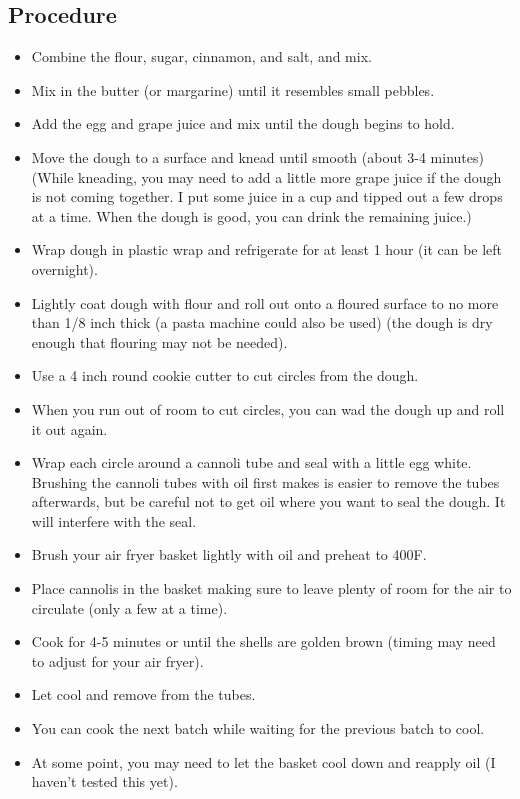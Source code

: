 \documentclass[10pt, openany]{book}
\begin{document}
\subsection{Procedure}
\begin{itemize}
  \item Combine the flour, sugar, cinnamon, and salt, and mix.
  \item Mix in the butter (or margarine) until it resembles small pebbles.
  \item Add the egg and grape juice and mix until the dough begins to hold.
  \item Move the dough to a surface and knead until smooth (about 3-4 minutes)  (While kneading, you may need to add a little more grape juice if the dough is not coming together.  I put some juice in a cup and tipped out a few drops at a time.  When the dough is good, you can drink the remaining juice.)
  \item Wrap dough in plastic wrap and refrigerate for at least 1 hour (it can be left overnight).
  \item Lightly coat dough with flour and roll out onto a floured surface to no more than 1/8 inch thick (a pasta machine could also be used) (the dough is dry enough that flouring may not be needed).
  \item Use a 4 inch round cookie cutter to cut circles from the dough.
  \item When you run out of room to cut circles, you can wad the dough up and roll it out again.
  \item Wrap each circle around a cannoli tube and seal with a little egg white.  Brushing the cannoli tubes with oil first makes is easier to remove the tubes afterwards, but be careful not to get oil where you want to seal the dough.  It will interfere with the seal.
  \item Brush your air fryer basket lightly with oil and preheat to 400\degree{}F.
  \item Place cannolis in the basket making sure to leave plenty of room for the air to circulate (only a few at a time).
  \item Cook for 4-5 minutes or until the shells are golden brown (timing may need to adjust for your air fryer).
  \item Let cool and remove from the tubes.
  \item You can cook the next batch while waiting for the previous batch to cool.
  \item At some point, you may need to let the basket cool down and reapply oil (I haven't tested this yet).
\end{itemize}
\end{document}
